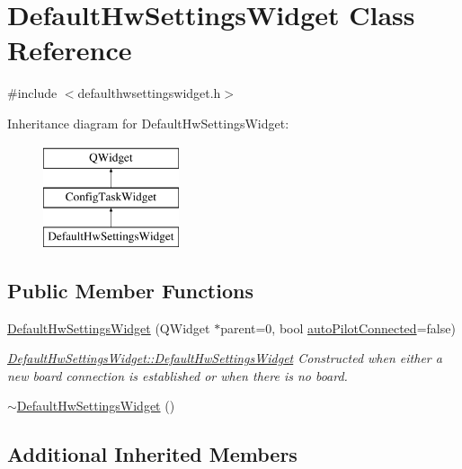 \hypertarget{class_default_hw_settings_widget}{\section{Default\-Hw\-Settings\-Widget Class Reference}
\label{class_default_hw_settings_widget}
}


{\ttfamily \#include $<$defaulthwsettingswidget.\-h$>$}

Inheritance diagram for Default\-Hw\-Settings\-Widget\-:\begin{figure}[H]
\begin{center}
\leavevmode
\includegraphics[height=3.000000cm]{class_default_hw_settings_widget}
\end{center}
\end{figure}
\subsection*{Public Member Functions}
\begin{DoxyCompactItemize}
\item 
\hyperlink{group___config_plugin_ga70b182d3a503dd16f8ac5c389306bc50}{Default\-Hw\-Settings\-Widget} (Q\-Widget $\ast$parent=0, bool \hyperlink{group___u_a_v_object_widget_utils_ga6812138654a8b49e72c674cee7245781}{auto\-Pilot\-Connected}=false)
\begin{DoxyCompactList}\small\item\em \hyperlink{group___config_plugin_ga70b182d3a503dd16f8ac5c389306bc50}{Default\-Hw\-Settings\-Widget\-::\-Default\-Hw\-Settings\-Widget} Constructed when either a new board connection is established or when there is no board. \end{DoxyCompactList}\item 
\hyperlink{group___config_plugin_ga0789663f8a021f1e85e03a41f99639c9}{$\sim$\-Default\-Hw\-Settings\-Widget} ()
\end{DoxyCompactItemize}
\subsection*{Additional Inherited Members}


